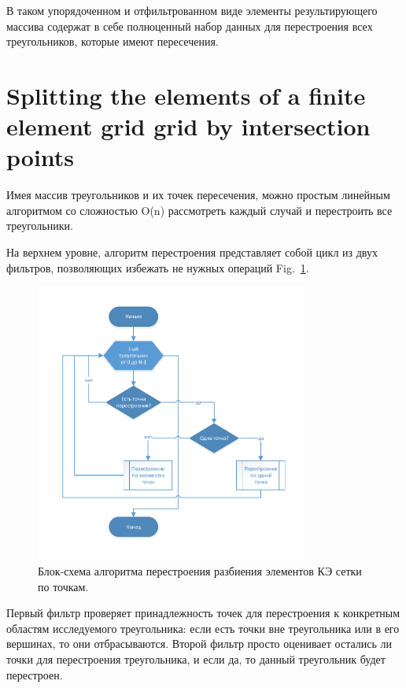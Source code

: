\documentclass[
11pt,%
tightenlines,%
twoside,%
onecolumn,%
nofloats,%
nobibnotes,%
nofootinbib,%
superscriptaddress,%
noshowpacs,%
centertags]%
{revtex4}
\begin{document}
В таком упорядоченном и отфильтрованном виде элементы результирующего массива содержат в себе полноценный набор данных для перестроения всех треугольников, которые имеют пересечения.

\section{Splitting the elements of a finite element grid grid by intersection points}

Имея массив треугольников и их точек пересечения, можно простым линейным алгоритмом со сложностью O(n) рассмотреть каждый случай и перестроить все треугольники.

На верхнем уровне, алгоритм перестроения представляет собой цикл из двух фильтров, позволяющих избежать не нужных операций Fig.~\ref{fig:6}.

\begin{figure}[h]
\includegraphics[width=0.8\textwidth]{pics/pic_6.pdf}
\caption{Блок-схема алгоритма перестроения разбиения элементов КЭ сетки по точкам.}\label{fig:6}
\end{figure}

Первый фильтр проверяет принадлежность точек для перестроения к конкретным областям исследуемого треугольника: если есть точки вне треугольника или в его вершинах, то они отбрасываются.
Второй фильтр просто оценивает остались ли точки для перестроения треугольника, и если да, то данный треугольник будет перестроен.
\end{document}
